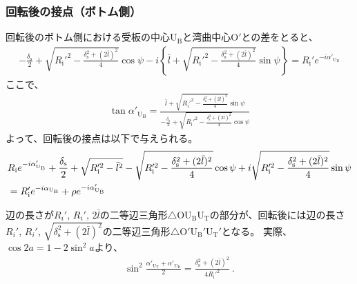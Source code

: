 \subsubsection{回転後の接点（ボトム側）}
回転後のボトム側における受板の中心U$_\mathrm B$と湾曲中心O$'$との差をとると、
\begin{align*}
  -\frac{\delta_\mathrm s}2+\sqrt{R_\mathrm i'^2-\frac{\delta_\mathrm s^2+(2\bar l)^2}4}\cos\psi
  -i\left\{\bar l+\sqrt{R_\mathrm i'^2-\frac{\delta_\mathrm s^2+(2\bar l)^2}4}\sin\psi\right\}
  = R_\mathrm i'e^{-i\alpha'_{\mathrm U_\mathrm B}}
\end{align*}
ここで、
\begin{align*}
  \tan\alpha'_{\mathrm U_\mathrm B}
  = \frac{\displaystyle\bar l+\sqrt{R_\mathrm i'^2-\frac{\delta_\mathrm s^2+(2\bar l)^2}4}\sin\psi}
         {\displaystyle-\frac{\delta_\mathrm s}2+\sqrt{R_\mathrm i'^2-\frac{\delta_\mathrm s^2+(2\bar l)^2}4}\cos\psi}
\end{align*}
よって、回転後の接点は以下で与えられる。
\begin{align}
  \notag
  &  R_\mathrm ie^{-i\alpha'_{\mathrm U_\mathrm B}}
     +\frac{\delta_\mathrm s}2+\sqrt{R_\mathrm i'^2-\bar l^2}-\sqrt{R_\mathrm i'^2-\frac{\delta_\mathrm s^2+(2\bar l)^2}4}\cos\psi
     +i\sqrt{R_\mathrm i'^2-\frac{\delta_\mathrm s^2+(2\bar l)^2}4}\sin\psi\\
  &= R_\mathrm i'e^{-i\alpha_{\mathrm U_\mathrm B}}+\rho e^{-i\alpha'_{\mathrm U_\mathrm B}}
   \label{eq:afterUBcontact}
\end{align}
\begin{hosoku}
辺の長さが$R_i'$, $R_i'$, $2\bar l$の二等辺三角形$\triangle$OU$_\mathrm B$U$_\mathrm T$の部分が、回転後には辺の長さ$R_i'$, $R_i'$, $\sqrt{\delta_\mathrm s^2+(2\bar l)^2}$の二等辺三角形$\triangle$O$'$U$_\mathrm B'$U$_\mathrm T'$となる。
実際、$\cos2a = 1-2\sin^2\!a$より、
\begin{align*}
  \sin^2\frac{\alpha'_{\mathrm U_\mathrm T}+\alpha'_{\mathrm U_\mathrm B}}2
  = \frac{\delta_\mathrm s^2+(2\bar l)^2}{4R_\mathrm i'^2}\ .
\end{align*}
\end{hosoku}



